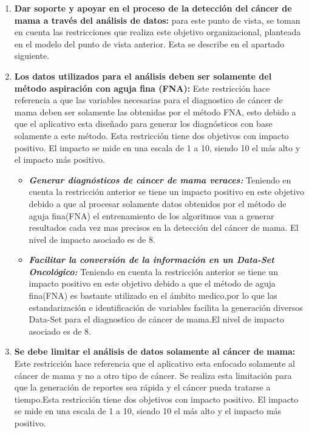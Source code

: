 \begin{enumerate}[label=\textbf{\arabic*})]
	\item  \textbf{Dar soporte y apoyar en el proceso de la detección del cáncer de mama a través del análisis de datos:} para este punto de vista, se toman en cuenta las restricciones que realiza
	este objetivo organizacional, planteada en el modelo del punto de vista anterior. Esta se describe en el apartado siguiente.
	
	\item  \textbf{Los datos utilizados para el análisis deben ser solamente del método aspiración con aguja fina (FNA):} Este restricción hace referencia a que las variables necesarias para el diagnostico de cáncer de mama deben ser solamente las obtenidas por el método FNA, esto debido a que el aplicativo esta diseñado para generar los diagnósticos con base solamente a este método. Esta restricción tiene dos objetivos con impacto positivo. El impacto se mide en una escala de 1 a 10, siendo 10 el más alto y el impacto más positivo.
	
	\begin{itemize}
		\item  \textbf{\textit{Generar diagnósticos de cáncer de mama veraces:}} Teniendo en cuenta la restricción anterior se tiene un impacto positivo en este objetivo debido a que al procesar solamente datos obtenidos por el método de aguja fina(FNA) el entrenamiento de los algoritmos van a generar resultados cada vez mas precisos en la detección del cáncer de mama. El nivel de impacto asociado es de 8.
		
		\item  \textbf{\textit{Facilitar la conversión de la información en un Data-Set Oncológico:}}
		Teniendo en cuenta la restricción anterior se tiene un impacto positivo en este objetivo debido a que el método de aguja fina(FNA) es bastante utilizado en el ámbito medico,por lo que las estandarización e identificación de variables facilita la generación diversos Data-Set para el diagnostico de cáncer de mama.El nivel de impacto asociado es de 8.
	\end{itemize}
	
	\item  \textbf{Se debe limitar el análisis de datos solamente al cáncer de mama:} Este restricción hace referencia que el aplicativo esta enfocado solamente al cáncer de mama y no a otro tipo de cáncer. Se realiza esta limitación para que la generación de reportes sea rápida y el cáncer pueda tratarse a tiempo.Esta restricción tiene dos objetivos con impacto positivo. El impacto se mide en una escala de 1 a 10, siendo 10 el más alto y el impacto más positivo.
	

\end{enumerate}
